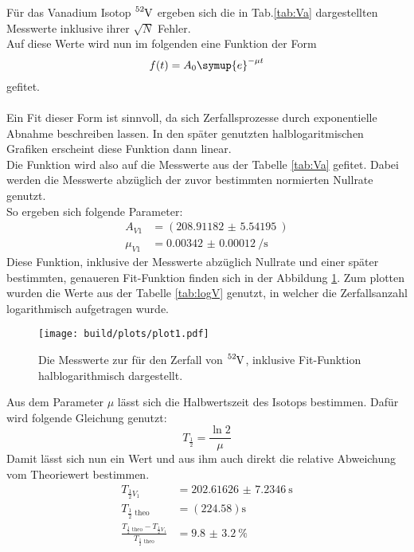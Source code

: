 \noindent
Für das Vanadium Isotop $\ce{^{52}_{}V}$ ergeben sich die in Tab.\ref{tab:Va} dargestellten Messwerte inklusive ihrer $\sqrt{N}$ Fehler.\\
Auf diese Werte wird nun im folgenden eine Funktion der Form
\begin{equation}
    f(t)= A_0 \symup{e}^{-\mu t}
    \label{eqn:fit}
\end{equation}
gefitet.\\\\
\noindent
Ein Fit dieser Form ist sinnvoll, da sich Zerfallsprozesse durch exponentielle Abnahme beschreiben lassen. 
In den später genutzten halblogaritmischen Grafiken erscheint diese Funktion dann linear.\\
Die Funktion wird also auf die Messwerte aus der Tabelle \ref{tab:Va} gefitet. 
Dabei werden die Messwerte abzüglich der zuvor bestimmten normierten Nullrate genutzt.\\
So ergeben sich folgende Parameter:
\begin{align*}
    A_{V1}&=(\SI{208.91182(554195)}{})\\
    \mu_{V1}&=\SI{0.00342(12)}{\per\second}
\end{align*}
\newline
\noindent
Diese Funktion, inklusive der Messwerte abzüglich Nullrate und einer später bestimmten, genaueren Fit-Funktion finden sich in der Abbildung \ref{img:V}.
Zum plotten wurden die Werte aus der Tabelle \ref{tab:logV} genutzt, in welcher die Zerfallsanzahl logarithmisch aufgetragen wurde.
\begin{figure}[H]
    \centering
    \texttt{[image: build/plots/plot1.pdf]}
    \caption{Die Messwerte zur für den Zerfall von $\ce{^{52}_{}V}$, inklusive Fit-Funktion halblogarithmisch dargestellt.}
    \label{img:V}
\end{figure}
\noindent
Aus dem Parameter $\mu$ lässt sich die Halbwertszeit des Isotops bestimmen. Dafür wird folgende Gleichung genutzt:
\begin{equation}
    T_{\frac{1}{2}}=\frac{\ln{2}}{\mu}
    \label{eqn:halb}
\end{equation}
Damit lässt sich nun ein Wert und aus ihm auch direkt die relative Abweichung vom Theoriewert\cite{Vanadium} bestimmen.
\begin{align*}
    T_{\frac{1}{2}V_1}&= \SI{202.61626(723460)}{\second}  \\
    T_{\frac{1}{2}\text{ theo}}&=(224.58)\si{\second} \\
    \frac{T_{\frac{1}{2}\text{ theo}}-T_{\frac{1}{2}V_1}}{T_{\frac{1}{2}\text{ theo}}}&=\SI{9.8(32)}{\percent}
\end{align*}
